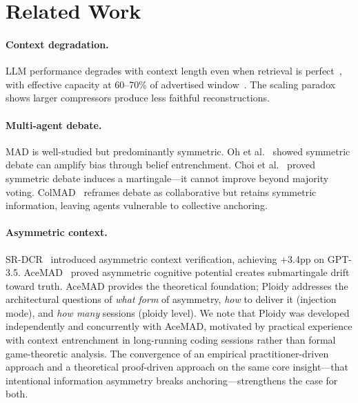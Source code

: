 \documentclass{article}
\begin{document}
\section{Related Work}
\label{sec:related}

\paragraph{Context degradation.} LLM performance degrades with context length even when retrieval is perfect~\citep{du2025context}, with effective capacity at 60--70\% of advertised window~\citep{chroma2025contextrot}. The scaling paradox~\citep{scaling2026paradox} shows larger compressors produce less faithful reconstructions.

\paragraph{Multi-agent debate.} MAD is well-studied but predominantly symmetric. Oh et al.~\citep{oh2025dreamad} showed symmetric debate can amplify bias through belief entrenchment. Choi et al.~\citep{choi2025debate} proved symmetric debate induces a martingale---it cannot improve beyond majority voting. ColMAD~\citep{chen2025colmad} reframes debate as collaborative but retains symmetric information, leaving agents vulnerable to collective anchoring.

\paragraph{Asymmetric context.} SR-DCR~\citep{srdcr2025} introduced asymmetric context verification, achieving +3.4pp on GPT-3.5. AceMAD~\citep{liu2026acemad} proved asymmetric cognitive potential creates submartingale drift toward truth. AceMAD provides the theoretical foundation; Ploidy addresses the architectural questions of \emph{what form} of asymmetry, \emph{how} to deliver it (injection mode), and \emph{how many} sessions (ploidy level). We note that Ploidy was developed independently and concurrently with AceMAD, motivated by practical experience with context entrenchment in long-running coding sessions rather than formal game-theoretic analysis. The convergence of an empirical practitioner-driven approach and a theoretical proof-driven approach on the same core insight---that intentional information asymmetry breaks anchoring---strengthens the case for both.
\end{document}
